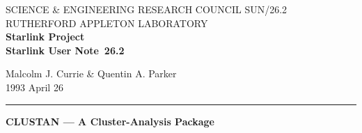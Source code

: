\pagestyle{myheadings}

\newcommand{\stardoccategory}  {Starlink User Note}
\newcommand{\stardocinitials}  {SUN}
\newcommand{\stardocnumber}    {26.2}
\newcommand{\stardocauthors}   {Malcolm J. Currie \& Quentin A. Parker}
\newcommand{\stardocdate}      {1993 April 26}
\newcommand{\stardoctitle}     {CLUSTAN --- A Cluster-Analysis Package}

\newcommand{\stardocname}{\stardocinitials /\stardocnumber}
\renewcommand{\_}{{\tt\char'137}}     %
\markright{\stardocname}
\setlength{\textwidth}{160mm}
\setlength{\textheight}{230mm}
\setlength{\topmargin}{-2mm}
\setlength{\oddsidemargin}{0mm}
\setlength{\evensidemargin}{0mm}
\setlength{\parindent}{0mm}
\setlength{\parskip}{\medskipamount}
\setlength{\unitlength}{1mm}

\newenvironment{refs}{\goodbreak
                      \vspace{3ex}
                      \begin{list}{}{\setlength{\topsep}{0mm}
                                     \setlength{\partopsep}{0mm}
                                     \setlength{\itemsep}{0mm}
                                     \setlength{\parsep}{0mm}
                                     \setlength{\leftmargin}{1.5em}
                                     \setlength{\itemindent}{-\leftmargin}
                                     \setlength{\labelsep}{0mm}
                                     \setlength{\labelwidth}{0mm}}
                    }{\end{list}}



\thispagestyle{empty}
SCIENCE \& ENGINEERING RESEARCH COUNCIL \hfill \stardocname\\
RUTHERFORD APPLETON LABORATORY\\
{\large\bf Starlink Project\\}
{\large\bf \stardoccategory\ \stardocnumber}
\begin{flushright}
\stardocauthors\\
\stardocdate
\end{flushright}
\vspace{-4mm}
\rule{\textwidth}{0.5mm}
\vspace{5mm}
\begin{center}
{\Large\bf \stardoctitle}
\end{center}
\vspace{5mm}

